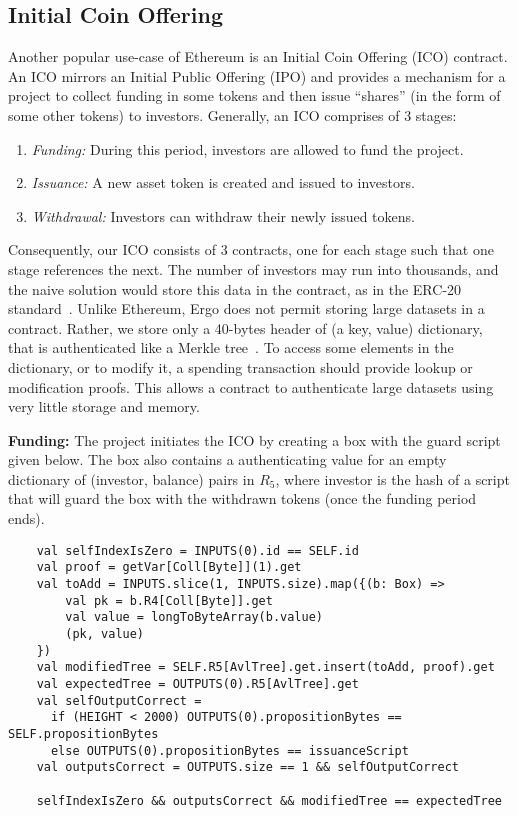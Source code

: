 \documentclass[runningheads]{llncs}
\begin{document}
\subsection{Initial Coin Offering}
\label{ico}

Another popular use-case of Ethereum is an Initial Coin Offering (ICO) contract. %
An ICO mirrors an Initial Public Offering (IPO) and provides a mechanism for a project to collect funding in some tokens and then issue ``shares'' (in the form of some other tokens) to investors. Generally, an ICO comprises of 3 stages:
\begin{enumerate}
	\item {\em Funding:} During this period, investors are allowed to fund the project.
	\item {\em Issuance:} A new asset token is created and issued to investors.
	\item {\em Withdrawal:} Investors can withdraw their newly issued tokens. 
\end{enumerate}

Consequently, our ICO consists of 3 contracts, one for each stage such that one stage references the next. 
The number of investors may run into thousands, and the naive solution would store this data in the contract, as in the ERC-20 standard~\cite{erc20}. 
Unlike Ethereum, Ergo does not permit storing large datasets in a contract. Rather, we store only a 40-bytes header of (a key, value) dictionary, that is authenticated like a Merkle tree~\cite{RMCI17}. To access some elements in the dictionary, or to modify it, a spending transaction should provide lookup or modification proofs. This allows a contract to authenticate large datasets using very little storage and memory. 

\textbf{Funding:} 
The project initiates the ICO by creating a box with the guard script given below. The box also contains a authenticating value for an empty dictionary of (investor, balance) pairs in $R_5$, where investor is the hash of a script that will guard the box with the withdrawn tokens (once the funding period ends). 

\small{\begin{verbatim}
	val selfIndexIsZero = INPUTS(0).id == SELF.id
	val proof = getVar[Coll[Byte]](1).get
	val toAdd = INPUTS.slice(1, INPUTS.size).map({(b: Box) =>
	    val pk = b.R4[Coll[Byte]].get
	    val value = longToByteArray(b.value)
	    (pk, value)
	})
	val modifiedTree = SELF.R5[AvlTree].get.insert(toAdd, proof).get
	val expectedTree = OUTPUTS(0).R5[AvlTree].get
	val selfOutputCorrect = 
	  if (HEIGHT < 2000) OUTPUTS(0).propositionBytes == SELF.propositionBytes
	  else OUTPUTS(0).propositionBytes == issuanceScript 
	val outputsCorrect = OUTPUTS.size == 1 && selfOutputCorrect
	
	selfIndexIsZero && outputsCorrect && modifiedTree == expectedTree
	\end{verbatim}
}
\end{document}
